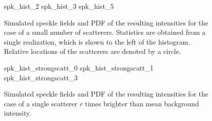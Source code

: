 \begin{figure}[ht]
  \centering
  {spk_hist_2}
  {spk_hist_3}
  {spk_hist_5}
  \caption{Simulated speckle fields and PDF of the resulting intensities for
    the case of a small number of scatterers.  Statistics are obtained from a
    single realization, which is shown to the left of the histogram.  Relative
    locations of the scatterers are denoted by a circle.}
  \label{fig:lowscatthist}
\end{figure}

\begin{figure}[ht]
  \centering
  {spk_hist_strongscatt_0}
  {spk_hist_strongscatt_1}
  {spk_hist_strongscatt_3}
  \caption{Simulated speckle fields and PDF of the resulting intensities for
    the case of a single scatterer $r$ times brighter than mean background
    intensity.}
  \label{fig:strongsinglefig}
\end{figure}

